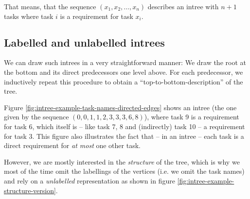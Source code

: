 That means, that the sequence $(x_1,x_2,\dots,x_n)$ describes an intree with $n+1$ tasks where task $i$ is a requirement for task $x_i$.

\subsection{Labelled and unlabelled intrees}
\label{sec:intrees-labelled-unlabelled}

We can draw such intrees in a very straightforward manner: We draw the root at the bottom and its direct predecessors one level above. For each predecessor, we inductively repeat this procedure to obtain a ``top-to-bottom-description'' of the tree.

Figure \ref{fig:intree-example-task-names-directed-edges} shows an intree (the one given by the sequence $(0,0,1,1,2,3,3,3,6,8)$), where task 9 is a requirement for task 6, which itself is -- like task 7, 8 and (indirectly) task 10 -- a requirement for task 3. This figure also illustrates the fact that -- in an intree -- each task is a direct requirement for \emph{at most} one other task.

However, we are mostly interested in the \emph{structure} of the tree, which is why we most of the time omit the labellings of the vertices (i.e. we omit the task names) and rely on a \emph{unlabelled} representation as shown in figure \ref{fig:intree-example-structure-version}. 

